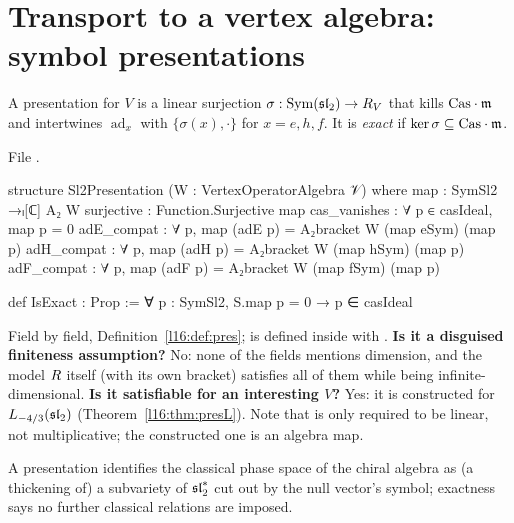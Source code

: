 \section{Transport to a vertex algebra: symbol presentations}\label{l16:sec:pres}

\begin{definition}\label{l16:def:pres}
A presentation for $V$ is a linear surjection $\sigma:\operatorname{Sym}(\mathfrak{sl}_2)\to R_V$ that kills
$\mathrm{Cas}\cdot\mathfrak m$ and intertwines $\operatorname{ad}_x$ with $\{\sigma(x),\cdot\}$ for $x = e,h,f$. It is
\emph{exact} if $\ker\sigma\subseteq\mathrm{Cas}\cdot\mathfrak m$.
\end{definition}
\noindent File .
\begin{leancode}
structure Sl2Presentation (W : VertexOperatorAlgebra 𝒱) where
  map : SymSl2 →ₗ[ℂ] A₂ W
  surjective : Function.Surjective map
  cas_vanishes : ∀ p ∈ casIdeal, map p = 0
  adE_compat : ∀ p, map (adE p) = A₂bracket W (map eSym) (map p)
  adH_compat : ∀ p, map (adH p) = A₂bracket W (map hSym) (map p)
  adF_compat : ∀ p, map (adF p) = A₂bracket W (map fSym) (map p)

def IsExact : Prop := ∀ p : SymSl2, S.map p = 0 → p ∈ casIdeal
\end{leancode}

\begin{dictionary}
Field by field, Definition~\ref{l16:def:pres};  is defined inside  with
. \textbf{Is it a disguised finiteness assumption?} No: none of the fields mentions
dimension, and the model $R$ itself (with its own bracket) satisfies all of them while being
infinite-dimensional. \textbf{Is it satisfiable for an interesting $V$?} Yes: it is constructed for $L_{-4/3}(\mathfrak{sl}_2)$
(Theorem~\ref{l16:thm:presL}). Note that  is only required to be linear, not multiplicative; the
constructed one is an algebra map.
\end{dictionary}

\begin{physics}
A presentation identifies the classical phase space of the chiral algebra as (a thickening of) a subvariety of
$\mathfrak{sl}_2^*$ cut out by the null vector's symbol; exactness says no further classical relations are imposed.
\end{physics}

